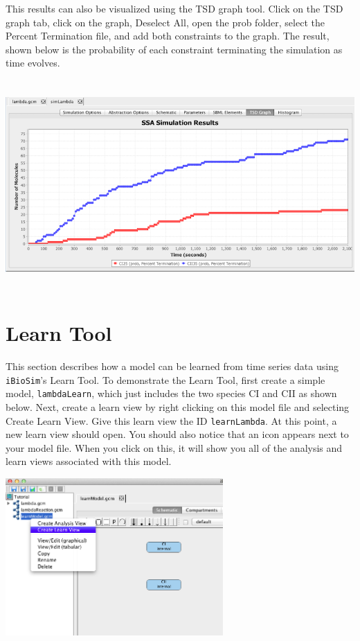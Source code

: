 \documentclass[titlepage,11pt]{article}
\begin{document}
This results can also be visualized using the TSD graph tool.  Click on the TSD graph tab, click on the graph, Deselect All, open the prob folder, select the Percent Termination file, and add both constraints to the graph.  The result, shown below is the probability of each constraint terminating the simulation as time evolves.  

\begin{center} 
\includegraphics[height=80mm]{screenshots/probResultsTSD}
\end{center}

\section{Learn Tool}

This section describes how a model can be learned from time series data using {\tt iBioSim}'s Learn Tool.  To demonstrate the Learn Tool, first create a simple model, {\tt lambdaLearn}, which just includes the two species CI and CII as shown below.  Next, create a learn view by right clicking on this model file and selecting Create Learn View.  Give this learn view the ID {\tt learnLambda}.  At this point, a new learn view should open.  You should also notice that an icon appears next to your model file.  When you click on this, it will show you all of the analysis and learn views associated with this model.

\begin{center}
\includegraphics[height=60mm]{screenshots/createLearn}
\end{center}
\end{document}
